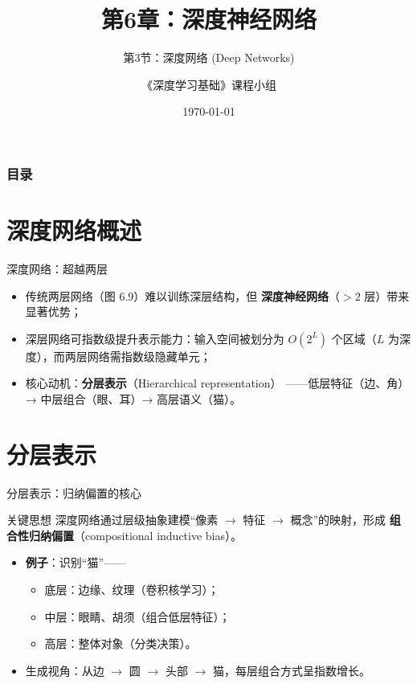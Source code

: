 \documentclass[t,aspectratio=169]{beamer} %
\title[6.3.深度网络]{第6章：深度神经网络}
\subtitle{第3节：深度网络 (Deep Networks)}
\author{《深度学习基础》课程小组}
\date{\today}
\begin{document}
\frame{\maketitle}

\begin{frame}
    \frametitle{目录}
    \tableofcontents
\end{frame}

\section{深度网络概述}
\begin{frame}{深度网络：超越两层}
\begin{itemize}
    \item 传统两层网络（图 6.9）难以训练深层结构，但 {\color{red}\textbf{深度神经网络}（$>2$ 层）}带来显著优势；
    \item 深层网络可指数级提升表示能力：输入空间被划分为 $O(2^L)$ 个区域（$L$ 为深度），而两层网络需指数级隐藏单元；
    \item 核心动机：{\color{red}\textbf{分层表示}（Hierarchical representation）}
    ——低层特征（边、角）→ 中层组合（眼、耳）→ 高层语义（猫）。
\end{itemize}
\end{frame}

\section{分层表示}
\begin{frame}{分层表示：归纳偏置的核心}
\begin{block}{关键思想}
    深度网络通过层级抽象建模“像素 $\to$ 特征 $\to$ 概念”的映射，形成 {\color{red}\textbf{组合性归纳偏置}（compositional inductive bias）}。
\end{block}

\begin{itemize}
    \item \textbf{例子}：识别“猫”——
        \begin{itemize}
            \item 底层：边缘、纹理（卷积核学习）；
            \item 中层：眼睛、胡须（组合低层特征）；
            \item 高层：整体对象（分类决策）。
        \end{itemize}
    \item 生成视角：从边 $\to$ 圆 $\to$ 头部 $\to$ 猫，每层组合方式呈指数增长。
\end{itemize}
\end{frame}
\end{document}
